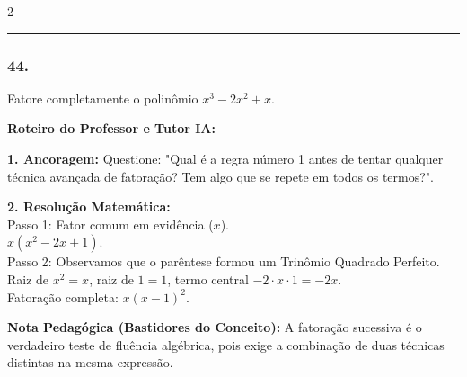 \begin{multicols*}{2}
\par\vspace{\espacoQuestao}

\noindent\textcolor{CorLinha}{\rule{\linewidth}{0.5pt}} 
\par\vspace{\espacoPreQuestao}
\subsubsection*{44.} 
\begin{enunciadoLiteral}
Fatore completamente o polinômio $x^3 - 2x^2 + x$.
\end{enunciadoLiteral}

\ifgabarito
    \begin{tcolorbox}[colback=CorTitUm!5, colframe=CorTitUm, boxrule=1pt, arc=4pt, left=6pt, right=6pt, top=6pt, bottom=6pt]
    \small\textbf{\textcolor{CorTitUm}{Roteiro do Professor e Tutor IA:}}\par\vspace{0.1cm}
    \color{CinzaEscuro}
    \textbf{1. Ancoragem:} Questione: "Qual é a regra número 1 antes de tentar qualquer técnica avançada de fatoração? Tem algo que se repete em todos os termos?".\par\vspace{0.1cm}
    \textbf{2. Resolução Matemática:}\\
    Passo 1: Fator comum em evidência ($x$).\\
    $x(x^2 - 2x + 1)$.\\
    Passo 2: Observamos que o parêntese formou um Trinômio Quadrado Perfeito.\\
    Raiz de $x^2 = x$, raiz de $1 = 1$, termo central $-2 \cdot x \cdot 1 = -2x$.\\
    Fatoração completa: $x(x - 1)^2$.
    \end{tcolorbox}
    \vspace{0.15cm}
    
    \begin{boxexplicacao}
    \textbf{Nota Pedagógica (Bastidores do Conceito):} A fatoração sucessiva é o verdadeiro teste de fluência algébrica, pois exige a combinação de duas técnicas distintas na mesma expressão.
    \end{boxexplicacao}
\fi

\par\vspace{\espacoQuestao}


\end{multicols*}
